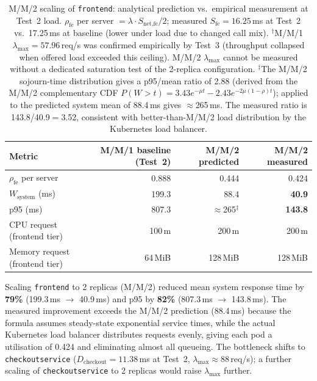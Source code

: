 \documentclass[12pt]{article}
\begin{document}
\begin{table}[H]
  \centering
  \small
  \setlength{\tabcolsep}{5pt}
  \begin{tabular}{l|r|r|r}
    \toprule
    Metric & M/M/1 baseline (Test~2) & M/M/2 predicted & M/M/2 measured \\
    \midrule
    $\rho_{\text{fe}}$ per server        & 0.888            & 0.444           & 0.424 \\
    $W_{\text{system}}$ (ms)          & 199.3            & 88.4            & \textbf{40.9} \\
    p95 (ms)                          & 807.3            & $\approx$265$^\ddagger$  & \textbf{143.8} \\
    CPU request (frontend tier)       & 100\,m           & 200\,m          & 200\,m \\
    Memory request (frontend tier)    & 64\,MiB          & 128\,MiB        & 128\,MiB \\
    \bottomrule
  \end{tabular}
  \caption{M/M/2 scaling of \texttt{frontend}: analytical prediction vs.\ empirical measurement at Test~2 load. $\rho_{\text{fe}}$ per server $= \lambda \cdot S_{\text{net,fe}} / 2$; measured $S_{\text{fe}} = 16.25$\,ms at Test~2 vs.\ 17.25\,ms at baseline (lower under load due to changed call mix). $^\dagger$M/M/1 $\lambda_{\max}=57.96$\,req/s was confirmed empirically by Test~3 (throughput collapsed when offered load exceeded this ceiling). M/M/2 $\lambda_{\max}$ cannot be measured without a dedicated saturation test of the 2-replica configuration. $^\ddagger$The M/M/2 sojourn-time distribution gives a p95/mean ratio of 2.88 (derived from the M/M/2 complementary CDF $P(W{>}t)=3.43e^{-\mu t}-2.43e^{-2\mu(1-\rho)t}$); applied to the predicted system mean of 88.4\,ms gives $\approx$265\,ms. The measured ratio is 143.8/40.9$=$3.52, consistent with better-than-M/M/2 load distribution by the Kubernetes load balancer.}
  \label{tab:opt-pred}
\end{table}

Scaling \texttt{frontend} to 2 replicas (M/M/2) reduced mean system response time by \textbf{79\%} (199.3\,ms $\to$ 40.9\,ms) and p95 by \textbf{82\%} (807.3\,ms $\to$ 143.8\,ms). The measured improvement exceeds the M/M/2 prediction (88.4\,ms) because the formula assumes steady-state exponential service times, while the actual Kubernetes load balancer distributes requests evenly, giving each pod a utilisation of 0.424 and eliminating almost all queueing. The bottleneck shifts to \texttt{checkoutservice} ($D_{\text{checkout}}=11.38$\,ms at Test~2, $\lambda_{\max} \approx 88$\,req/s); a further scaling of \texttt{checkoutservice} to 2 replicas would raise $\lambda_{\max}$ further.
\end{document}
